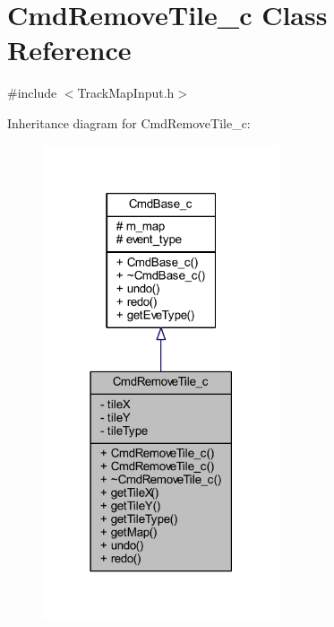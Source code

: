 \hypertarget{class_cmd_remove_tile__c}{\section{Cmd\+Remove\+Tile\+\_\+c Class Reference}
\label{class_cmd_remove_tile__c}
}


{\ttfamily \#include $<$Track\+Map\+Input.\+h$>$}



Inheritance diagram for Cmd\+Remove\+Tile\+\_\+c\+:\nopagebreak
\begin{figure}[H]
\begin{center}
\leavevmode
\includegraphics[width=198pt]{class_cmd_remove_tile__c__inherit__graph}
\end{center}
\end{figure}


